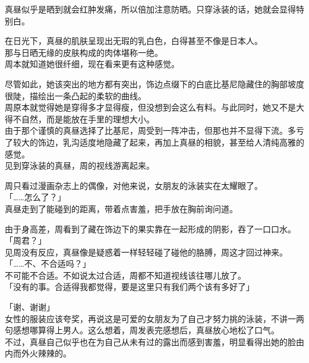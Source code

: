 真昼似乎是晒到就会红肿发痛，所以倍加注意防晒。只穿泳装的话，她就会显得特别白。

在日光下，真昼的肌肤呈现出无瑕的乳白色，白得甚至不像是日本人。\\

那与日晒无缘的皮肤构成的肉体堪称一绝。\\

周本就知道她很纤细，现在看来更有这种感觉。

尽管如此，她该突出的地方都有突出，饰边点缀下的白底比基尼隐藏住的胸部坡度很陡，描绘出一条凸起的柔软的曲线。\\

周原本就觉得她是穿得多才显得瘦，但没想到会这么有料。与此同时，她又不是大得不自然，而是能放在手里的理想大小。\\

由于那个谨慎的真昼选择了比基尼，周受到一阵冲击，但那也并不显得下流。多亏了较大的饰边，乳沟适度地隐藏了起来，再加上真昼的相貌，甚至给人清纯高雅的感觉。\\

见到穿泳装的真昼，周的视线游离起来。

周只看过漫画杂志上的偶像，对他来说，女朋友的泳装实在太耀眼了。\\

「……怎么了？」\\

真昼走到了能碰到的距离，带着点害羞，把手放在胸前询问道。

由于身高差，周看到了藏在饰边下的果实靠在一起形成的阴影，吞了一口口水。\\

「周君？」\\

见周没有反应，真昼像是疑惑着一样轻轻碰了碰他的胳膊，周这才回过神来。\\

「……不、不合适吗？」\\

不可能不合适。不如说太过合适，周都不知道视线该往哪儿放了。\\

「没有的事。合适得我都觉得，要是这里只有我们两个该有多好了」

「谢、谢谢」\\

女性的服装应该夸奖，再说这是可爱的女朋友为了自己才努力挑的泳装，不讲一两句感想哪算得上男人。这么想着，周发表完感想后，真昼放心地松了口气。\\

不过，真昼自己似乎也在为自己从未有过的露出而感到害羞，明显看得出她的脸由内而外火辣辣的。\\

